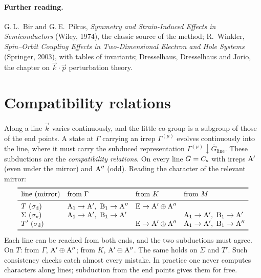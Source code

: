 \paragraph{Further reading.}
G.\,L.\ Bir and G.\,E.\ Pikus, \emph{Symmetry and Strain-Induced Effects in Semiconductors}
(Wiley, 1974), the classic source of the method; R.\ Winkler, \emph{Spin--Orbit Coupling
Effects in Two-Dimensional Electron and Hole Systems} (Springer, 2003), with tables of
invariants; Dresselhaus, Dresselhaus and Jorio, the chapter on $\vec{k}\cdot\vec{p}$
perturbation theory.

\section{Compatibility relations}\label{sec:compat}

Along a line $\vec{k}$ varies continuously, and the little co-group is a subgroup of
those of the end points. A state at $\Gamma$ carrying an irrep $\Gamma^{(\mu)}$ evolves
continuously into the line, where it must carry the subduced representation
$\Gamma^{(\mu)}\!\downarrow\!\bar{G}_{\text{line}}$. These subductions are the
\emph{compatibility relations}. On every line $\bar{G}=C_{\mathrm{s}}$ with irreps $\mathrm{A}'$
(even under the mirror) and $\mathrm{A}''$ (odd). Reading the character of the
relevant mirror:
\[
\begin{array}{llll}
\toprule
\text{line (mirror)} & \text{from } \Gamma & \text{from } K & \text{from } M\\
\midrule
T\ (\sd) & \irr{A}_1\to\irr{A}',\ \irr{B}_1\to\irr{A}'' & \irr{E}\to\irr{A}'\oplus\irr{A}'' & \\
\Sigma\ (\sv) & \irr{A}_1\to\irr{A}',\ \irr{B}_1\to\irr{A}' & & \irr{A}_1\to\irr{A}',\ \irr{B}_1\to\irr{A}'\\
T'\ (\sd) & & \irr{E}\to\irr{A}'\oplus\irr{A}'' & \irr{A}_1\to\irr{A}',\ \irr{B}_1\to\irr{A}''\\
\bottomrule
\end{array}
\]
Each line can be reached from both ends, and the two subductions must agree. On $T$:
from $\Gamma$, $\mathrm{A}'\oplus\mathrm{A}''$; from $K$, $\mathrm{A}'\oplus\mathrm{A}''$. The same holds
on $\Sigma$ and $T'$. Such consistency checks catch almost every mistake. In practice
one never computes characters along lines; subduction from the end points gives them
for free.


